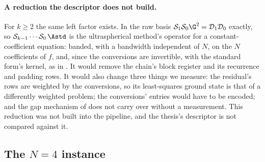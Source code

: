 \paragraph{A reduction the descriptor does not build.} For $k\ge2$ the same left factor exists. In the raw basis $\mathcal{S}_1\mathcal{S}_0\G^2=\mathcal{D}_1\mathcal{D}_0$ exactly, so $\mathcal{S}_{k-1}\cdots\mathcal{S}_0\,\Astd$ is the ultraspherical method's operator for a constant-coefficient equation: banded, with a bandwidth independent of $N$, on the $N$ coefficients of $f$, and, since the conversions are invertible, with the standard form's kernel, as in . It would remove the chain's block register and its recurrence and padding rows. It would also change three things we measure: the residual's rows are weighted by the conversions, so its least-squares ground state is that of a differently weighted problem; the conversions' entries would have to be encoded; and the gap mechanism of  does not carry over without a measurement. This reduction was not built into the pipeline, and the thesis's descriptor is not compared against it.

\subsection{The \texorpdfstring{$N = 4$}{N = 4} instance}


